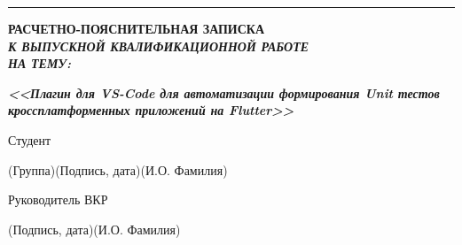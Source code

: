\documentclass[14pt, russian]{scrartcl}
\begin{document}
\begin{titlepage}
\vspace*{-16pt}
\hspace{25pt}\rule{0.875\textwidth}{0.4pt}
 
 
\vspace{3em}
 
\begin{center}
\Large \bf{РАСЧЕТНО-ПОЯСНИТЕЛЬНАЯ ЗАПИСКА\\\textbf{\textit{К ВЫПУСКНОЙ КВАЛИФИКАЦИОННОЙ РАБОТЕ\\НА ТЕМУ:}} \\}
\end{center}

\vspace*{-6ex} 
\begin{center}
\Large{\textit{\textbf{<<Плагин для VS-Code для автоматизации формирования Unit тестов кроссплатформенных приложений на Flutter>>}}}
\end{center}
 
\vspace{\fill}
 

\newlength{\ML}

\noindent Студент \underline{}
 \hfill \underline{\hspace{4cm}}\quad 
 \underline{}

\vspace{-2.1ex}
\noindent\hspace{9ex}\scriptsize{(Группа)}\normalsize\hspace{170pt}\hspace{2ex}\scriptsize{(Подпись, дата)}\normalsize\hspace{30pt}\hspace{6ex}\scriptsize{(И.О. Фамилия)}\normalsize

\bigskip

\noindent Руководитель ВКР \hfill \underline{\hspace{4cm}}\quad \underline{}

\vspace{-2ex}
\noindent\hspace{13.5ex}\normalsize\hspace{170pt}\hspace{2ex}\scriptsize{(Подпись, дата)}\normalsize\hspace{30pt}\hspace{6ex}\scriptsize{(И.О. Фамилия)}\normalsize


\end{titlepage}
\end{document}
